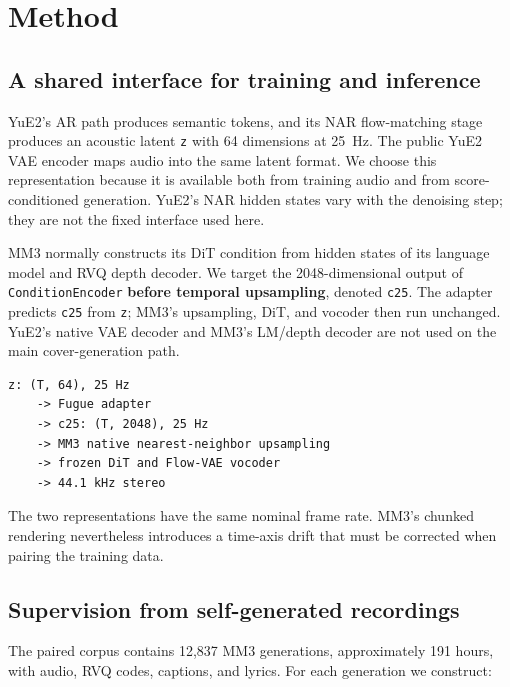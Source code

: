 \documentclass[11pt,a4paper]{article}
\newcommand{\code}[1]{\texttt{#1}}
\begin{document}
\section{Method}

\subsection{A shared interface for training and inference}

YuE2's AR path produces semantic tokens, and its NAR flow-matching stage produces an acoustic latent \code{z} with 64 dimensions at 25~Hz. The public YuE2 VAE encoder maps audio into the same latent format. We choose this representation because it is available both from training audio and from score-conditioned generation. YuE2's NAR hidden states vary with the denoising step; they are not the fixed interface used here.

MM3 normally constructs its DiT condition from hidden states of its language model and RVQ depth decoder. We target the 2048-dimensional output of \code{ConditionEncoder} \textbf{before temporal upsampling}, denoted \code{c25}. The adapter predicts \code{c25} from \code{z}; MM3's upsampling, DiT, and vocoder then run unchanged. YuE2's native VAE decoder and MM3's LM/depth decoder are not used on the main cover-generation path.

\begin{Verbatim}[frame=single,fontsize=\small,samepage=true,xleftmargin=1em,xrightmargin=1em]
z: (T, 64), 25 Hz
    -> Fugue adapter
    -> c25: (T, 2048), 25 Hz
    -> MM3 native nearest-neighbor upsampling
    -> frozen DiT and Flow-VAE vocoder
    -> 44.1 kHz stereo
\end{Verbatim}

The two representations have the same nominal frame rate. MM3's chunked rendering nevertheless introduces a time-axis drift that must be corrected when pairing the training data.

\subsection{Supervision from self-generated recordings}

The paired corpus contains 12,837 MM3 generations, approximately 191 hours, with audio, RVQ codes, captions, and lyrics. For each generation we construct:
\end{document}
